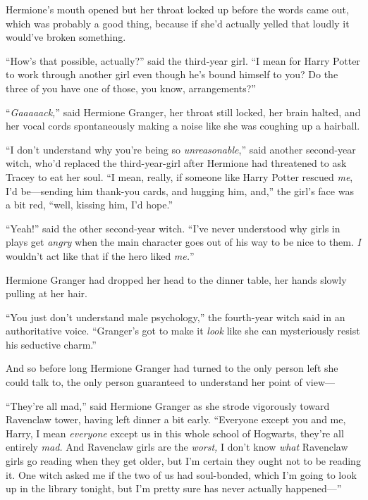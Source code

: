 Hermione’s mouth opened but her throat locked up before the words came out, which was probably a good thing, because if she’d actually yelled that loudly it would’ve broken something.

“How’s that possible, actually?” said the third-year girl. “I mean for Harry Potter to work through another girl even though he’s bound himself to you? Do the three of you have one of those, you know, arrangements?”

“\emph{Gaaaaack,}” said Hermione Granger, her throat still locked, her brain halted, and her vocal cords spontaneously making a noise like she was coughing up a hairball.


“I don’t understand why you’re being so \emph{unreasonable},” said another second-year witch, who’d replaced the third-year-girl after Hermione had threatened to ask Tracey to eat her soul. “I mean, really, if someone like Harry Potter rescued \emph{me}, I’d be—sending him thank-you cards, and hugging him, and,” the girl’s face was a bit red, “well, kissing him, I’d hope.”

“Yeah!” said the other second-year witch. “I’ve never understood why girls in plays get \emph{angry} when the main character goes out of his way to be nice to them. \emph{I} wouldn’t act like that if the hero liked \emph{me.}”

Hermione Granger had dropped her head to the dinner table, her hands slowly pulling at her hair.

“You just don’t understand male psychology,” the fourth-year witch said in an authoritative voice. “Granger’s got to make it \emph{look} like she can mysteriously resist his seductive charm.”


And so before long Hermione Granger had turned to the only person left she could talk to, the only person guaranteed to understand her point of view—

“They’re all mad,” said Hermione Granger as she strode vigorously toward Ravenclaw tower, having left dinner a bit early. “Everyone except you and me, Harry, I mean \emph{everyone} except us in this whole school of Hogwarts, they’re all entirely \emph{mad.} And Ravenclaw girls are the \emph{worst,} I don’t know \emph{what} Ravenclaw girls go reading when they get older, but I’m certain they ought not to be reading it. One witch asked me if the two of us had soul-bonded, which I’m going to look up in the library tonight, but I’m pretty sure has never actually happened—”

